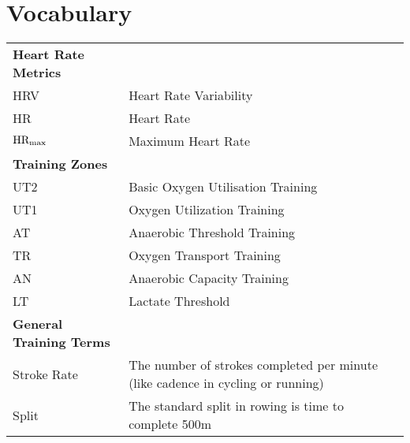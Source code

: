 \documentclass[a4paper,oneside,12pt]{book}
\title{\thesistitle}
\author{\authorname}
\numberwithin{equation}{chapter} %
\begin{document}


% 

% 
% 

\tableofcontents
\listoffigures
\listoftables
\newpage
\section*{\Huge{Vocabulary}}
\begin{tabular}{lp{9cm}l}
  \textbf{Heart Rate Metrics} \\
  HRV & Heart Rate Variability \\
  HR & Heart Rate \\
  $\textnormal{HR}_{\text{max}}$ & Maximum Heart Rate \\
  \textbf{Training Zones} \\
  UT2 & Basic Oxygen Utilisation Training \\
  UT1 & Oxygen Utilization Training \\
  AT & Anaerobic Threshold Training \\
  TR & Oxygen Transport Training \\
  AN & Anaerobic Capacity Training \\
  LT & Lactate Threshold \\
  \textbf{General Training Terms} \\
  Stroke Rate & The number of strokes completed per minute (like cadence in cycling or running) \\
  Split & The standard split in rowing is time to complete 500m \\
\end{tabular}
\vspace{2cm}
\end{document}

